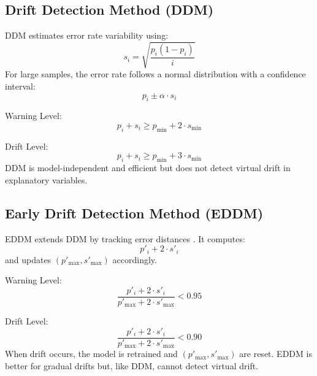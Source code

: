 \hypertarget{drift-detection-method-ddm}{%
\subsection{Drift Detection Method (DDM)}\label{drift-detection-method-ddm}}

DDM estimates error rate variability using:
\begin{equation}
s_i = \sqrt{\frac{p_i(1 - p_i)}{i}}
\end{equation}
For large samples, the error rate follows a normal distribution with a confidence interval:
\begin{equation}
p_i \pm \alpha \cdot s_i
\end{equation}

Warning Level:
\begin{equation}
p_i + s_i \geq p_{\text{min}} + 2 \cdot s_{\text{min}}
\end{equation}

Drift Level:
\begin{equation}
p_i + s_i \geq p_{\text{min}} + 3 \cdot s_{\text{min}}
\end{equation}
DDM is model-independent and efficient but does not detect virtual drift in explanatory variables.

\hypertarget{early-drift-detection-method-eddm}{%
\subsection{Early Drift Detection Method (EDDM)}\label{early-drift-detection-method-eddm}}

EDDM extends DDM by tracking error distances \citep{baena_garcia_2006}. It computes:
\begin{equation}
p'_i + 2 \cdot s'_i
\end{equation}
and updates \((p'_{\text{max}}, s'_{\text{max}})\) accordingly.

Warning Level:
\begin{equation}
\frac{p'_i + 2 \cdot s'_i}{p'_{\text{max}} + 2 \cdot s'_{\text{max}}} < 0.95
\end{equation}

Drift Level:
\begin{equation}
\frac{p'_i + 2 \cdot s'_i}{p'_{\text{max}} + 2 \cdot s'_{\text{max}}} < 0.90
\end{equation}
When drift occurs, the model is retrained and \((p'_{\text{max}}, s'_{\text{max}})\) are reset. EDDM is better for gradual drifts but, like DDM, cannot detect virtual drift.

